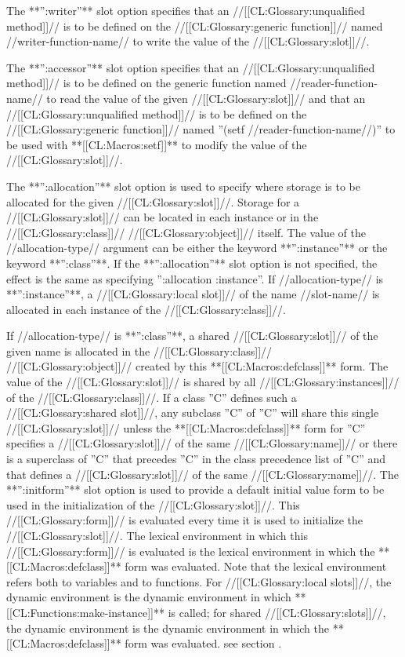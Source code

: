 \itemitem{\bull} The **'':writer''** slot option specifies that an //[[CL:Glossary:unqualified method]]// is to be defined on the //[[CL:Glossary:generic function]]// named //writer-function-name// to write the value of the //[[CL:Glossary:slot]]//.

\itemitem{\bull} The **'':accessor''** slot option specifies that an //[[CL:Glossary:unqualified method]]// is to be defined on the generic function named //reader-function-name// to read the value of the given //[[CL:Glossary:slot]]// and that an //[[CL:Glossary:unqualified method]]// is to be defined on the //[[CL:Glossary:generic function]]// named ''(setf //reader-function-name//)'' to be used with **[[CL:Macros:setf]]** to modify the value of the //[[CL:Glossary:slot]]//.

\itemitem{\bull} The **'':allocation''** slot option is used to specify where storage is to be allocated for the given //[[CL:Glossary:slot]]//. Storage for a //[[CL:Glossary:slot]]// can be located in each instance or in the //[[CL:Glossary:class]]// //[[CL:Glossary:object]]// itself. The value of the //allocation-type// argument can be either the keyword **'':instance''** or the keyword **'':class''**. If the **'':allocation''** slot option is not specified, the effect is the same as specifying '':allocation :instance''. \beginlist \itemitem{--} If //allocation-type// is **'':instance''**, a //[[CL:Glossary:local slot]]// of the name //slot-name// is allocated in each instance of the //[[CL:Glossary:class]]//.

\itemitem{--} If //allocation-type// is **'':class''**, a shared //[[CL:Glossary:slot]]// of the given name is allocated in the //[[CL:Glossary:class]]// //[[CL:Glossary:object]]// created by this **[[CL:Macros:defclass]]** form. The value of the //[[CL:Glossary:slot]]// is shared by all //[[CL:Glossary:instances]]// of the //[[CL:Glossary:class]]//. If a class ''C'' defines such a //[[CL:Glossary:shared slot]]//, any subclass ''C'' of ''C'' will share this single //[[CL:Glossary:slot]]// unless the **[[CL:Macros:defclass]]** form for ''C'' specifies a //[[CL:Glossary:slot]]// of the same //[[CL:Glossary:name]]// or there is a superclass of ''C'' that precedes ''C'' in the class precedence list of ''C'' and that defines a //[[CL:Glossary:slot]]// of the same //[[CL:Glossary:name]]//. \endlist \itemitem{\bull} The **'':initform''** slot option is used to provide a default initial value form to be used in the initialization of the //[[CL:Glossary:slot]]//. This //[[CL:Glossary:form]]// is evaluated every time it is used to initialize the //[[CL:Glossary:slot]]//. The lexical environment in which this //[[CL:Glossary:form]]// is evaluated is the lexical environment in which the **[[CL:Macros:defclass]]** form was evaluated. Note that the lexical environment refers both to variables and to functions. For //[[CL:Glossary:local slots]]//, the dynamic environment is the dynamic environment in which **[[CL:Functions:make-instance]]** is called; for shared //[[CL:Glossary:slots]]//, the dynamic environment is the dynamic environment in which the **[[CL:Macros:defclass]]** form was evaluated. see section {\secref\ObjectCreationAndInit}.

